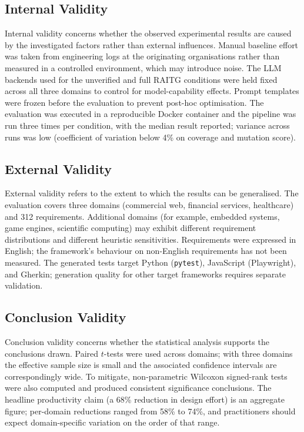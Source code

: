 \documentclass[11pt,letterpaper]{article}
\begin{document}
\subsection{Internal Validity}

Internal validity concerns whether the observed experimental results are caused by the investigated factors rather than external influences. Manual baseline effort was taken from engineering logs at the originating organisations rather than measured in a controlled environment, which may introduce noise. The LLM backends used for the unverified and full RAITG conditions were held fixed across all three domains to control for model-capability effects. Prompt templates were frozen before the evaluation to prevent post-hoc optimisation. The evaluation was executed in a reproducible Docker container and the pipeline was run three times per condition, with the median result reported; variance across runs was low (coefficient of variation below 4\% on coverage and mutation score).

\subsection{External Validity}

External validity refers to the extent to which the results can be generalised. The evaluation covers three domains (commercial web, financial services, healthcare) and 312 requirements. Additional domains (for example, embedded systems, game engines, scientific computing) may exhibit different requirement distributions and different heuristic sensitivities. Requirements were expressed in English; the framework's behaviour on non-English requirements has not been measured. The generated tests target Python (\texttt{pytest}), JavaScript (Playwright), and Gherkin; generation quality for other target frameworks requires separate validation.

\subsection{Conclusion Validity}

Conclusion validity concerns whether the statistical analysis supports the conclusions drawn. Paired $t$-tests were used across domains; with three domains the effective sample size is small and the associated confidence intervals are correspondingly wide. To mitigate, non-parametric Wilcoxon signed-rank tests were also computed and produced consistent significance conclusions. The headline productivity claim (a 68\% reduction in design effort) is an aggregate figure; per-domain reductions ranged from 58\% to 74\%, and practitioners should expect domain-specific variation on the order of that range.
\end{document}
